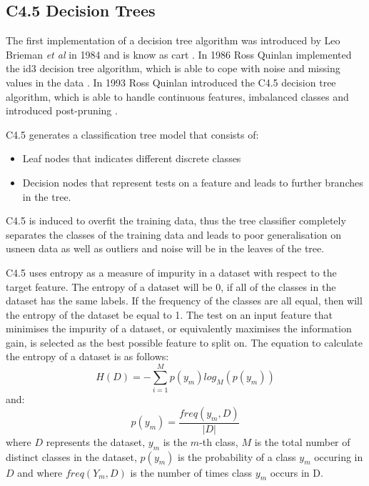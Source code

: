 \documentclass[10pt, conference]{IEEEtran}
\begin{document}
\subsection{C4.5 Decision Trees}\label{CT_background}

The first implementation of a decision tree algorithm was introduced by Leo Brieman \textit{et al} in 1984 and
is know as \acrfull{cart} \cite{CART_ref}. In 1986 Ross Quinlan implemented the \acrfull{id3} decision tree
algorithm, which is able to cope with noise and missing values in the data \cite{ID3_ref}. In 1993 Ross Quinlan
introduced the C4.5 decision tree algorithm, which is able to handle continuous features, imbalanced classes and
introduced post-pruning \cite{C4.5_ref}.

C4.5 generates a classification tree model that consists of:
\begin{itemize}
    \item Leaf nodes that indicates different discrete classes
    \item Decision nodes that represent tests on a feature and leads to further branches in the tree.
\end{itemize}
C4.5 is induced to overfit the training data, thus the tree classifier completely separates the classes of the
training data and leads to poor generalisation on usneen data as well as outliers and noise will be in the leaves of
the tree.

C4.5 uses entropy as a measure of impurity in a dataset with respect to the target feature. The entropy of a
dataset will be 0, if all of the classes in the dataset has the same labels. If the frequency of the
classes are all equal, then will the entropy of the dataset be equal to 1. The test on an input feature
that minimises the impurity of a dataset, or equivalently maximises the information gain, is selected as the
best possible feature to split on. The equation to calculate the entropy of a dataset is as follows:
\begin{equation}
    H(D)=-\sum_{i=1}^{M} p(y_m)log_M (p(y_m))\label{entropy}
\end{equation}
and:
\begin{equation}
    p(y_m) = \frac{freq(y_m,D)}{\left\lvert D \right\rvert }\label{class_prob} 
\end{equation}
where $D$ represents the dataset, $y_m$ is the $m$-th class, $M$ is the total number of distinct classes in the
dataset, $p(y_m)$ is the probability of a class $y_m$ occuring in $D$ and where $freq(Y_m,D)$ is the number of
times class $y_m$ occurs in D.
\end{document}
